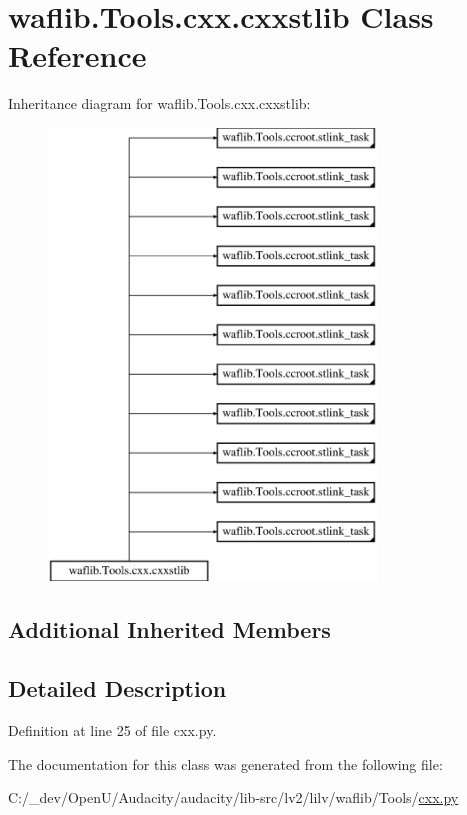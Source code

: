 \hypertarget{classwaflib_1_1_tools_1_1cxx_1_1cxxstlib}{}\section{waflib.\+Tools.\+cxx.\+cxxstlib Class Reference}
\label{classwaflib_1_1_tools_1_1cxx_1_1cxxstlib}
Inheritance diagram for waflib.\+Tools.\+cxx.\+cxxstlib\+:\begin{figure}[H]
\begin{center}
\leavevmode
\includegraphics[height=12.000000cm]{classwaflib_1_1_tools_1_1cxx_1_1cxxstlib}
\end{center}
\end{figure}
\subsection*{Additional Inherited Members}


\subsection{Detailed Description}


Definition at line 25 of file cxx.\+py.



The documentation for this class was generated from the following file\+:\begin{DoxyCompactItemize}
\item 
C\+:/\+\_\+dev/\+Open\+U/\+Audacity/audacity/lib-\/src/lv2/lilv/waflib/\+Tools/\hyperlink{lilv_2waflib_2_tools_2cxx_8py}{cxx.\+py}\end{DoxyCompactItemize}
